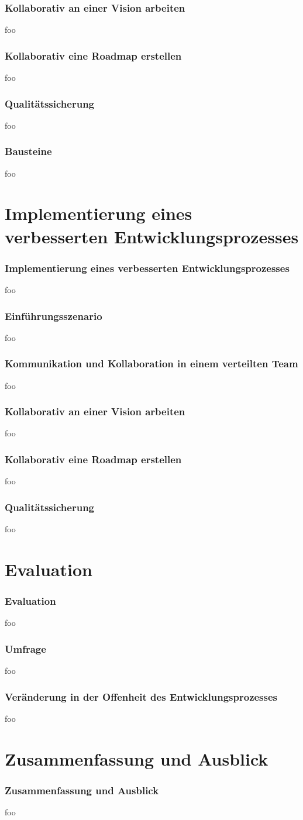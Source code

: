 \documentclass{beamer}
\begin{document}
\begin{frame}
\frametitle{Kollaborativ an einer Vision arbeiten}
foo
\end{frame}

\begin{frame}
\frametitle{Kollaborativ eine Roadmap erstellen}
foo
\end{frame}

\begin{frame}
\frametitle{Qualit\"atssicherung}
foo
\end{frame}

\begin{frame}
\frametitle{Bausteine}
foo
\end{frame}

\section{Implementierung eines verbesserten Entwicklungsprozesses}

\begin{frame}
\frametitle{Implementierung eines verbesserten Entwicklungsprozesses}
foo
\end{frame}

\begin{frame}
\frametitle{Einf\"uhrungsszenario}
foo
\end{frame}

\begin{frame}
\frametitle{Kommunikation und Kollaboration in einem verteilten Team}
foo
\end{frame}

\begin{frame}
\frametitle{Kollaborativ an einer Vision arbeiten}
foo
\end{frame}

\begin{frame}
\frametitle{Kollaborativ eine Roadmap erstellen}
foo
\end{frame}

\begin{frame}
\frametitle{Qualit\"atssicherung}
foo
\end{frame}

\section{Evaluation}

\begin{frame}
\frametitle{Evaluation}
foo
\end{frame}

\begin{frame}
\frametitle{Umfrage}
foo
\end{frame}

\begin{frame}
\frametitle{Ver\"anderung in der Offenheit des Entwicklungsprozesses}
foo
\end{frame}

\section{Zusammenfassung und Ausblick}

\begin{frame}
\frametitle{Zusammenfassung und Ausblick}
foo
\end{frame}
\end{document}
